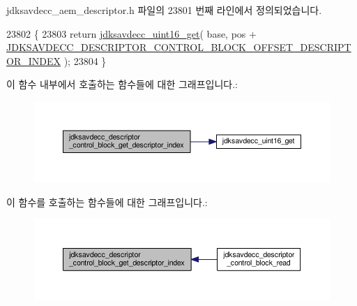 jdksavdecc\+\_\+aem\+\_\+descriptor.\+h 파일의 23801 번째 라인에서 정의되었습니다.


\begin{DoxyCode}
23802 \{
23803     \textcolor{keywordflow}{return} \hyperlink{group__endian_ga3fbbbc20be954aa61e039872965b0dc9}{jdksavdecc\_uint16\_get}( base, pos + 
      \hyperlink{group__descriptor__control__block_gaf019aebb8212d11727cca9ab7ba97fee}{JDKSAVDECC\_DESCRIPTOR\_CONTROL\_BLOCK\_OFFSET\_DESCRIPTOR\_INDEX}
       );
23804 \}
\end{DoxyCode}


이 함수 내부에서 호출하는 함수들에 대한 그래프입니다.\+:
\nopagebreak
\begin{figure}[H]
\begin{center}
\leavevmode
\includegraphics[width=350pt]{group__descriptor__control__block_ga5f83c5755ec74b7051fe847c5fd2b467_cgraph}
\end{center}
\end{figure}




이 함수를 호출하는 함수들에 대한 그래프입니다.\+:
\nopagebreak
\begin{figure}[H]
\begin{center}
\leavevmode
\includegraphics[width=350pt]{group__descriptor__control__block_ga5f83c5755ec74b7051fe847c5fd2b467_icgraph}
\end{center}
\end{figure}


